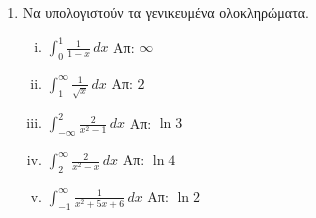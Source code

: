 \begin{enumerate}
\item Να υπολογιστούν τα γενικευμένα ολοκληρώματα.

  \begin{enumerate}[i)]
    \item $ \int _{0}^{1} \frac{1}{1-x} \,{dx} $ \hfill Απ: $ \infty $ 
    \item $ \int _{1}^{\infty} \frac{1}{\sqrt{x}} \,{dx} $ \hfill Απ: $2$ 
    \item $ \int _{- \infty}^{2} \frac{2}{x^{2}-1} \,{dx} $ \hfill Απ: $ \ln{3}$ 
    \item $ \int _{2}^{\infty} \frac{2}{x^{2}-x} \,{dx} $ \hfill Απ: $ \ln{4}$ 
    \item $ \int _{-1}^{\infty} \frac{1}{x^{2}+5x+6} \,{dx} $ \hfill Απ: $ \ln{2}$ 
  \end{enumerate}


\end{enumerate}









